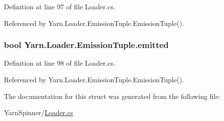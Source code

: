 Definition at line 97 of file Loader.\-cs.



Referenced by Yarn.\-Loader.\-Emission\-Tuple.\-Emission\-Tuple().

\hypertarget{a00091_a5916dbbd4d2e24ddfd02b0afdea290bf}{
\subsubsection[{emitted}]{\setlength{\rightskip}{0pt plus 5cm}bool Yarn.\-Loader.\-Emission\-Tuple.\-emitted}}\label{a00091_a5916dbbd4d2e24ddfd02b0afdea290bf}


Definition at line 98 of file Loader.\-cs.



Referenced by Yarn.\-Loader.\-Emission\-Tuple.\-Emission\-Tuple().



The documentation for this struct was generated from the following file\-:\begin{DoxyCompactItemize}
\item 
Yarn\-Spinner/\hyperlink{a00300}{Loader.\-cs}\end{DoxyCompactItemize}
